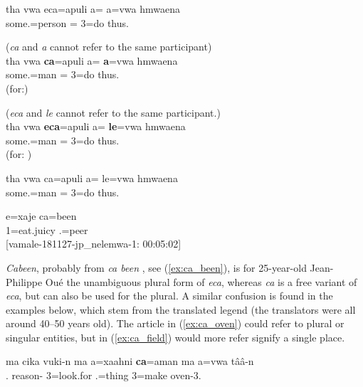 \ea \label{ex:ca_eca_old}
\gll tha vwa eca=apuli a= a=vwa hmwaena	\\
   some.=person = 3=do thus. \\
\glt	{}
\z

\ea
(\textit{ca} and \textit{a}  cannot refer to the same participant)\\
\gll *tha vwa \textbf{ca}=apuli a= \textbf{a}=vwa hmwaena	\\
   some.=man = 3=do thus.	\\
\glt (for:)	
\z

\ea
(\textit{eca} and \textit{le} cannot refer to the same participant.)\\
\gll *tha vwa \textbf{eca}=apuli a= \textbf{le}=vwa hmwaena	\\
   some.=man = 3=do thus.	\\
\glt (for: )	
\z

\ea
\gll tha vwa ca=apuli a= le=vwa hmwaena	\\
   some.=man = 3=do thus.	\\
\glt	{}
\z


\ea \label{ex:ca_been}
\gll e=xaje ca=been\\
 1=eat.juicy .=peer\\
\glt {} {[vamale-181127-jp\_nelemwa-1: 00:05:02]}
\z

\textit{Cabeen}, probably from \textit{ca been} , see (\ref{ex:ca_been}), is for 25-year-old Jean-Philippe Oué the unambiguous plural form of \textit{eca}, whereas \textit{ca} is a free variant of \textit{eca}, but can also be used for the plural. A similar confusion is found in the examples below, which stem from the translated legend (the translators were all around 40–50 years old). The article in (\ref{ex:ca_oven}) could refer to plural or singular entities, but in (\ref{ex:ca_field}) would more refer signify a single place.


%
%
\ea \label{ex:ca_oven}
\gll ma cika vuki-n ma a=xaahni \textbf{ca}=aman ma a=vwa tââ-n\\
  . reason-  3=look.for .=thing  3=make oven-3.	\\
\glt {}
\z

